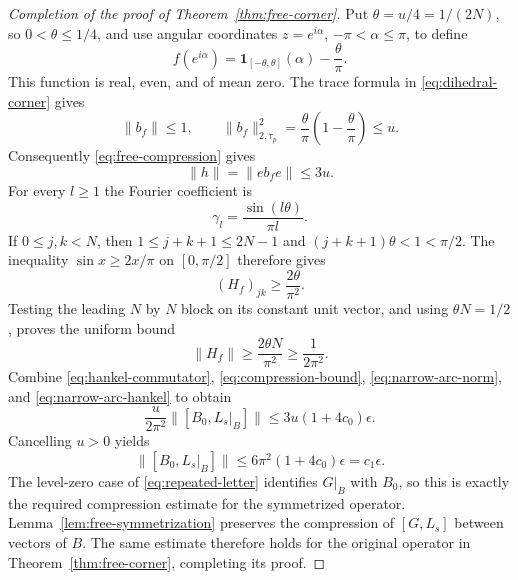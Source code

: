 \begin{proof}[Completion of the proof of Theorem~\ref{thm:free-corner}]
Put $\theta=u/4=1/(2N)$, so $0<\theta\le1/4$, and use angular coordinates
$z=e^{i\alpha}$, $-\pi<\alpha\le\pi$, to define
\[
  f(e^{i\alpha})=\mathbf1_{[-\theta,\theta]}(\alpha)-\frac\theta\pi.
\]
This function is real, even, and of mean zero. The trace formula in
\eqref{eq:dihedral-corner} gives
\[
  \|b_f\|\le1,\qquad
  \|b_f\|_{2,\tau_p}^2
       =\frac\theta\pi\left(1-\frac\theta\pi\right)\le u.
\]
Consequently \eqref{eq:free-compression} gives
\begin{equation}
  \|h\|=\|eb_fe\|\le3u.
  \label{eq:narrow-arc-norm}
\end{equation}
For every $l\ge1$ the Fourier coefficient is
\[
  \gamma_l=\frac{\sin(l\theta)}{\pi l}.
\]
If $0\le j,k<N$, then $1\le j+k+1\le2N-1$ and
$(j+k+1)\theta<1<\pi/2$. The inequality
$\sin x\ge2x/\pi$ on $[0,\pi/2]$ therefore gives
\[
  (H_f)_{jk}\ge\frac{2\theta}{\pi^2}.
\]
Testing the leading $N$ by $N$ block on its constant unit vector,
and using $\theta N=1/2$, proves the uniform bound
\begin{equation}
  \|H_f\|\ge\frac{2\theta N}{\pi^2}\ge\frac1{2\pi^2}.
  \label{eq:narrow-arc-hankel}
\end{equation}
Combine \eqref{eq:hankel-commutator}, \eqref{eq:compression-bound},
\eqref{eq:narrow-arc-norm}, and \eqref{eq:narrow-arc-hankel} to obtain
\[
  \frac{u}{2\pi^2}\|[B_0,L_s|_B]\|
       \le3u(1+4c_0)\epsilon.
\]
Cancelling $u>0$ yields
\[
  \|[B_0,L_s|_B]\|
      \le6\pi^2(1+4c_0)\epsilon=c_1\epsilon.
\]
The level-zero case of \eqref{eq:repeated-letter} identifies $G|_B$
with $B_0$, so this is exactly the required compression estimate for
the symmetrized operator. Lemma~\ref{lem:free-symmetrization} preserves
the compression of $[G,L_s]$ between vectors of $B$. The same estimate
therefore holds for the original operator in
Theorem~\ref{thm:free-corner}, completing its proof.
\end{proof}
